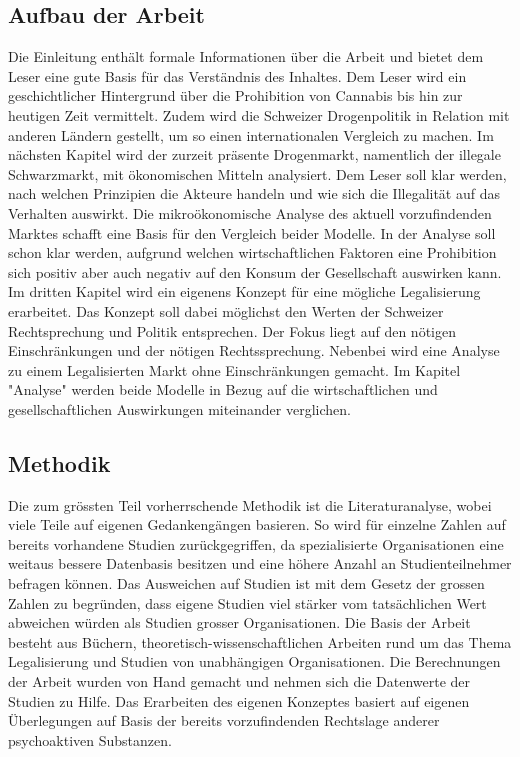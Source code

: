 \documentclass[../main.tex]{subfiles}
\begin{document}
	 \subsection{Aufbau der Arbeit}
	 Die Einleitung enthält formale Informationen über die Arbeit und bietet dem Leser eine gute Basis für das Verständnis des Inhaltes. 
	 Dem Leser wird ein geschichtlicher Hintergrund über die Prohibition von Cannabis bis hin zur heutigen Zeit vermittelt. 
	 Zudem wird die Schweizer Drogenpolitik in Relation mit anderen Ländern gestellt, um so einen internationalen Vergleich zu machen.
	 Im nächsten Kapitel wird der zurzeit präsente Drogenmarkt, namentlich der illegale Schwarzmarkt, mit ökonomischen Mitteln analysiert. 
	 Dem Leser soll klar werden, nach welchen Prinzipien die Akteure handeln und wie sich die Illegalität auf das Verhalten auswirkt.
	 Die mikroökonomische Analyse des aktuell vorzufindenden Marktes schafft eine Basis für den Vergleich beider Modelle.
	 In der Analyse soll schon klar werden, aufgrund welchen wirtschaftlichen Faktoren eine Prohibition sich positiv aber auch negativ auf den Konsum der Gesellschaft auswirken kann. 
	 Im dritten Kapitel wird ein eigenens Konzept für eine mögliche Legalisierung erarbeitet. 
	 Das Konzept soll dabei möglichst den Werten der Schweizer Rechtsprechung und Politik entsprechen.
	 Der Fokus liegt auf den nötigen Einschränkungen und der nötigen Rechtssprechung.
	 Nebenbei wird eine Analyse zu einem Legalisierten Markt ohne Einschränkungen gemacht.
	 Im Kapitel "Analyse" werden beide Modelle in Bezug auf die wirtschaftlichen und gesellschaftlichen Auswirkungen miteinander verglichen. 
	 
	 
	 
	 \subsection{Methodik}
	 Die zum grössten Teil vorherrschende Methodik ist die Literaturanalyse, wobei viele Teile auf eigenen Gedankengängen basieren. 
	 So wird für einzelne Zahlen auf bereits vorhandene Studien zurückgegriffen, da spezialisierte Organisationen eine weitaus bessere Datenbasis besitzen und eine höhere Anzahl an Studienteilnehmer befragen können. 
	 Das Ausweichen auf Studien ist mit dem Gesetz der grossen Zahlen zu begründen, dass eigene Studien viel stärker vom tatsächlichen Wert abweichen würden als Studien grosser Organisationen.
	 Die Basis der Arbeit besteht aus Büchern, theoretisch-wissenschaftlichen Arbeiten rund um das Thema Legalisierung und Studien von unabhängigen Organisationen.
	 Die Berechnungen der Arbeit wurden von Hand gemacht und nehmen sich die Datenwerte der Studien zu Hilfe.
	 Das Erarbeiten des eigenen Konzeptes basiert auf eigenen Überlegungen auf Basis der bereits vorzufindenden Rechtslage anderer psychoaktiven Substanzen.
\end{document}
